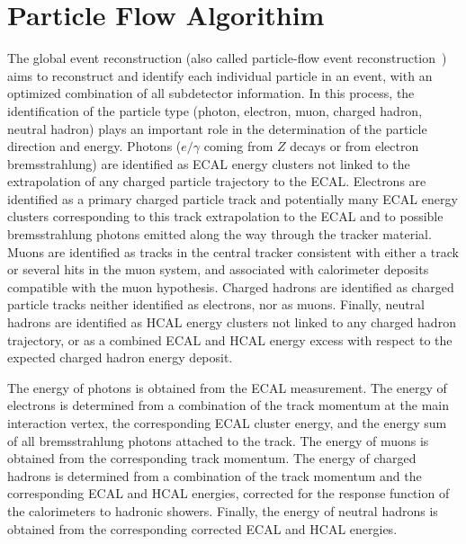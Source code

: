 
\section{Particle Flow Algorithim}

The global event reconstruction (also called particle-flow event reconstruction~\cite{CMS-PRF-14-001}) aims to reconstruct and identify each individual particle in an event, with an optimized combination of all subdetector information. In this process, the identification of the particle type (photon, electron, muon, charged hadron, neutral hadron) plays an important role in the determination of the particle direction and energy. Photons ($e/\gamma$ coming from $Z$ decays or from electron bremsstrahlung) are identified as ECAL energy clusters not linked to the extrapolation of any charged particle trajectory to the ECAL. Electrons are identified as a primary charged particle track and potentially many ECAL energy clusters corresponding to this track extrapolation to the ECAL and to possible bremsstrahlung photons emitted along the way through the tracker material. Muons are identified as tracks in the central tracker consistent with either a track or several hits in the muon system, and associated with calorimeter deposits compatible with the muon hypothesis. Charged hadrons are identified as charged particle tracks neither identified as electrons, nor as muons. Finally, neutral hadrons are identified as HCAL energy clusters not linked to any charged hadron trajectory, or as a combined ECAL and HCAL energy excess with respect to the expected charged hadron energy deposit.

The energy of photons is obtained from the ECAL measurement. The energy of electrons is determined from a combination of the track momentum at the main interaction vertex, the corresponding ECAL cluster energy, and the energy sum of all bremsstrahlung photons attached to the track. The energy of muons is obtained from the corresponding track momentum. The energy of charged hadrons is determined from a combination of the track momentum and the corresponding ECAL and HCAL energies, corrected for the response function of the calorimeters to hadronic showers. Finally, the energy of neutral hadrons is obtained from the corresponding corrected ECAL and HCAL energies.

